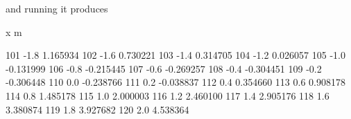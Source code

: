 and running it produces
\begin{code}
               x            m

101         -1.8     1.165934
102         -1.6     0.730221
103         -1.4     0.314705
104         -1.2     0.026057
105         -1.0    -0.131999
106         -0.8    -0.215445
107         -0.6    -0.269257
108         -0.4    -0.304451
109         -0.2    -0.306448
110          0.0    -0.238766
111          0.2    -0.038837
112          0.4     0.354660
113          0.6     0.908178
114          0.8     1.485178
115          1.0     2.000003
116          1.2     2.460100
117          1.4     2.905176
118          1.6     3.380874
119          1.8     3.927682
120          2.0     4.538364
\end{code}

